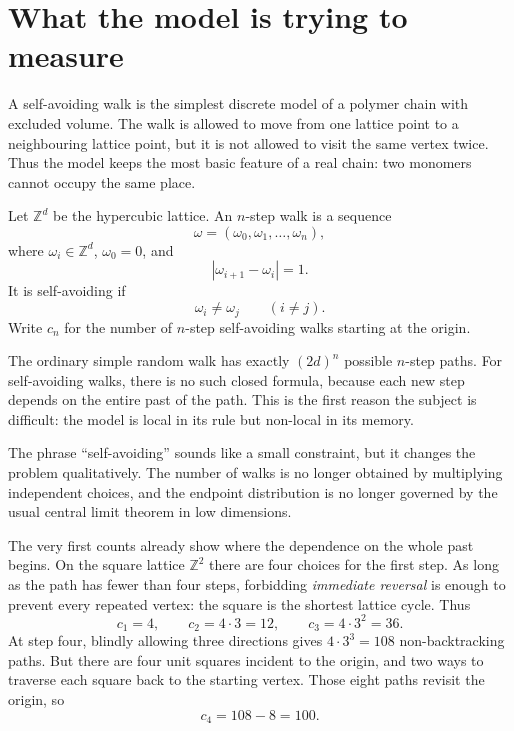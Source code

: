 
\section{What the model is trying to measure}

A self-avoiding walk is the simplest discrete model of a polymer chain with excluded volume.  The walk is allowed to move from one lattice point to a neighbouring lattice point, but it is not allowed to visit the same vertex twice.  Thus the model keeps the most basic feature of a real chain: two monomers cannot occupy the same place.

Let \(\mathbb Z^d\) be the hypercubic lattice.  An \(n\)-step walk is a sequence
\[
  \omega=(\omega_0,\omega_1,\ldots,\omega_n),
\]
where \(\omega_i\in\mathbb Z^d\), \(\omega_0=0\), and
\[
  |\omega_{i+1}-\omega_i|=1.
\]
It is self-avoiding if
\[
  \omega_i\ne \omega_j \qquad (i\ne j).
\]
Write \(c_n\) for the number of \(n\)-step self-avoiding walks starting at the origin.

The ordinary simple random walk has exactly \((2d)^n\) possible \(n\)-step paths.  For self-avoiding walks, there is no such closed formula, because each new step depends on the entire past of the path.  This is the first reason the subject is difficult: the model is local in its rule but non-local in its memory.

\begin{remark}
The phrase ``self-avoiding'' sounds like a small constraint, but it changes the problem qualitatively.  The number of walks is no longer obtained by multiplying independent choices, and the endpoint distribution is no longer governed by the usual central limit theorem in low dimensions.
\end{remark}


The very first counts already show where the dependence on the whole past begins. On the square lattice $\mathbb Z^2$ there are four choices for the first step. As long as the path has fewer than four steps, forbidding \emph{immediate reversal} is enough to prevent every repeated vertex: the square is the shortest lattice cycle. Thus
\[
 c_1=4,\qquad c_2=4\cdot3=12,\qquad
 c_3=4\cdot3^2=36.
\]
At step four, blindly allowing three directions gives $4\cdot3^3=108$ non-backtracking paths. But there are four unit squares incident to the origin, and two ways to traverse each square back to the starting vertex. Those eight paths revisit the origin, so
\[
 \boxed{c_4=108-8=100.}
\]


